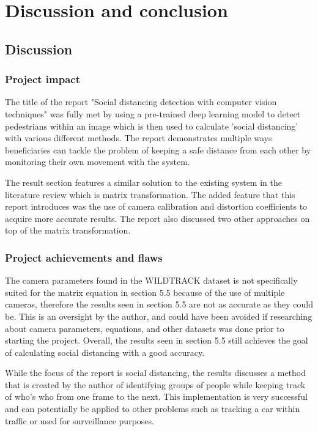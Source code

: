 \documentclass[12pt]{report}
\begin{document}
\chapter{Discussion and conclusion}

\section{Discussion}

\subsection{Project impact}

The title of the report "Social distancing detection with computer vision techniques" was fully met by using a pre-trained deep learning model to detect pedestrians within an image which is then used to calculate 'social distancing' with various different methods. The report demonstrates multiple ways beneficiaries can tackle the problem of keeping a safe distance from each other by monitoring their own movement with the system.

\vspace{2mm}

The result section features a similar solution to the existing system in the literature review which is matrix transformation. The added feature that this report introduces was the use of camera calibration and distortion coefficients to acquire more accurate results. The report also discussed two other approaches on top of the matrix transformation.

\subsection{Project achievements and flaws}

The camera parameters found in the WILDTRACK dataset is not specifically suited for the matrix equation in section 5.5 because of the use of multiple cameras, therefore the results seen in section 5.5 are not as accurate as they could be. This is an oversight by the author, and could have been avoided if researching about camera parameters, equations, and other datasets was done prior to starting the project. Overall, the results seen in section 5.5 still achieves the goal of calculating social distancing with a good accuracy. 

\vspace{2mm}

While the focus of the report is social distancing, the results discusses a method that is created by the author of identifying groups of people while keeping track of who's who from one frame to the next. This implementation is very successful and can potentially be applied to other problems such as tracking a car within traffic or used for surveillance purposes.
\end{document}
